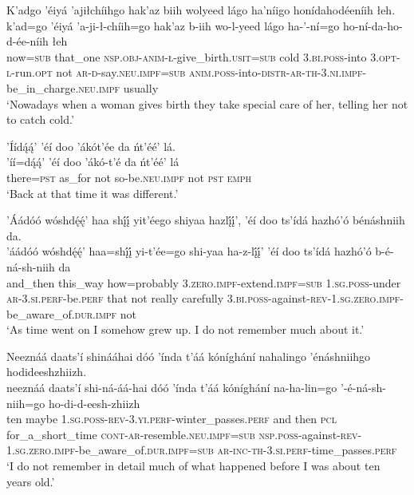 \ea\label{ex:text1-4-4}
K’adgo ’éiyá ’ajiłchíihgo hak’az biih wolyeed lágo ha’níigo honídahodéeníih łeh.\\
\gll k’ad=go	’éiyá	’a-ji-ł-chíih=go	hak’az	b-iih	wo-l-yeed	lágo	ha-’-ní=go	ho-ní-da-ho-d-ée-níih	łeh\\
     now=\textsc{sub}	that\_one	\textsc{nsp}.\textsc{obj}-\textsc{anim}-\textsc{ł}-give\_birth.\textsc{usit}=\textsc{sub}	cold	3.\textsc{bi}.\textsc{poss}-into	3.\textsc{opt}-\textsc{l}-run.\textsc{opt}	not	\textsc{ar}-\textsc{d}-say.\textsc{neu}.\textsc{impf}=\textsc{sub}	\textsc{anim}.\textsc{poss}-into-\textsc{distr}-\textsc{ar}-\textsc{th}-3.\textsc{ni}.\textsc{impf}-be\_in\_charge.\textsc{neu}.\textsc{impf}	usually\\
\glt `Nowadays when a woman gives birth they take special care of her, telling her not to catch cold.'
\z

\newpage
\ea\label{ex:text1-4-5}
’Íídą́ą́’ ’éí doo ’ákót’ée da ńt’éé’ lá.\\
\gll ’íí=dą́ą́’	’éí	doo	’ákó-t’é	da	ńt’éé’	lá\\
     there=\textsc{pst}	as\_for	not	so-be.\textsc{neu}.\textsc{impf}	not	\textsc{pst}	\textsc{emph}\\
\glt `Back at that time it was different.'
\z

\ea\label{ex:text1-5-1}
’Áádóó wóshdę́ę́’ haa shį́į́ yit’éego shiyaa hazlį́į́’, ’éí doo ts’ídá hazhó’ó bénáshniih da.\\
\gll ’áádóó	wóshdę́ę́’	haa=shį́į́	yi-t’ée=go	shi-yaa	ha-z-lį́į́’	’éí	doo	ts’ídá	hazhó’ó	b-é-ná-sh-niih	da\\
     and\_then	this\_way	how=probably	3.\textsc{zero}.\textsc{impf}-extend.\textsc{impf}=\textsc{sub}	1.\textsc{sg}.\textsc{poss}-under	\textsc{ar}-3.\textsc{si}.\textsc{perf}-be.\textsc{perf}	that	not	really	carefully	3.\textsc{bi}.\textsc{poss}-against-\textsc{rev}-1.\textsc{sg}.\textsc{zero}.\textsc{impf}-be\_aware\_of.\textsc{dur}.\textsc{impf}	not\\
\glt `As time went on I somehow grew up. I do not remember much about it.'
\z

\ea\label{ex:text1-5-2}
Neeznáá daats’í shinááhai dóó ’índa t’áá kóníghání nahalingo ’énáshniihgo hodideeshzhiizh.\\
\gll neeznáá	daats’í	shi-ná-áá-hai dóó	’índa	t’áá kóníghání na-ha-lin=go {’-é-ná-sh-niih=go} ho-di-d-eesh-zhiizh\\
     ten	   maybe	1.\textsc{sg}.\textsc{poss}-\textsc{rev}-3.\textsc{yi}.\textsc{perf}-winter\_passes.\textsc{perf}	and	then	\textsc{pcl}	for\_a\_short\_time	\textsc{cont}-\textsc{ar}-resemble.\textsc{neu}.\textsc{impf}=\textsc{sub}	\textsc{nsp}.\textsc{poss}-against-\textsc{rev}-1.\textsc{sg}.\textsc{zero}.\textsc{impf}-be\_aware\_of.\textsc{dur}.\textsc{impf}=\textsc{sub}	\textsc{ar}-\textsc{inc}-\textsc{th}-3.\textsc{si}.\textsc{perf}-time\_passes.\textsc{perf}\\
\glt `I do not remember in detail much of what happened before I was about ten years old.'
\z

